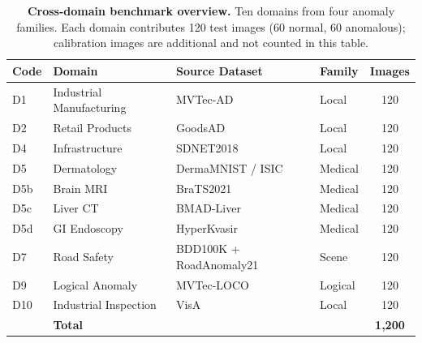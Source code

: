 \begin{table}[t]
\centering
\caption{%
    \textbf{Cross-domain benchmark overview.}
    Ten domains from four anomaly families.
    Each domain contributes 120 test images (60 normal, 60 anomalous); calibration images are additional and not counted in this table.
}
\label{tab:benchmark}
\small
\begin{tabular}{@{}llllc@{}}
\toprule
Code & Domain & Source Dataset & Family & Images \\
\midrule
D1  & Industrial Manufacturing & MVTec-AD          & Local     & 120 \\
D2  & Retail Products          & GoodsAD           & Local     & 120 \\
D4  & Infrastructure           & SDNET2018         & Local     & 120 \\
D5  & Dermatology              & DermaMNIST / ISIC & Medical   & 120 \\
D5b & Brain MRI                & BraTS2021         & Medical   & 120 \\
D5c & Liver CT                 & BMAD-Liver        & Medical   & 120 \\
D5d & GI Endoscopy             & HyperKvasir       & Medical   & 120 \\
D7  & Road Safety              & BDD100K + RoadAnomaly21 & Scene & 120 \\
D9  & Logical Anomaly          & MVTec-LOCO        & Logical   & 120 \\
D10 & Industrial Inspection    & VisA              & Local     & 120 \\
\midrule
    & \textbf{Total}           &                   &           & \textbf{1{,}200} \\
\bottomrule
\end{tabular}
\end{table}


